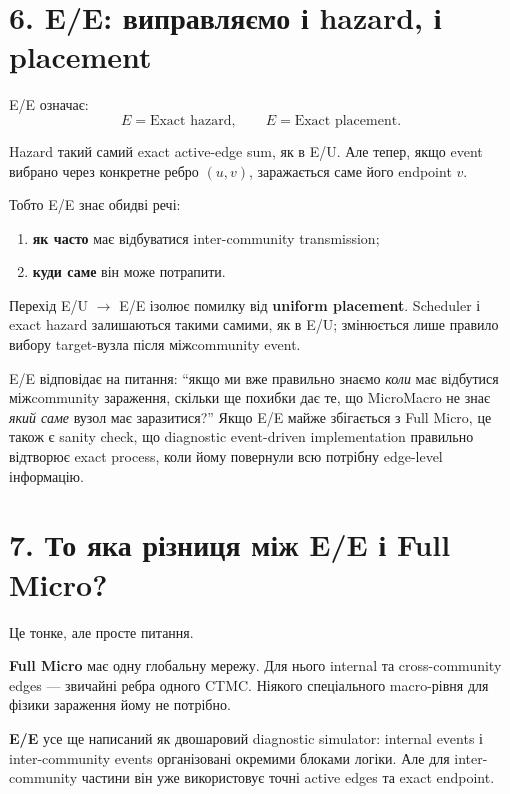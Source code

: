 \documentclass[11pt,a4paper]{article}
\begin{document}
\section*{6. E/E: виправляємо і hazard, і placement}

E/E означає:
\[
 \boxed{E=\text{Exact hazard}},\qquad
 \boxed{E=\text{Exact placement}}.
\]

Hazard такий самий exact active-edge sum, як в E/U. Але тепер, якщо event вибрано через конкретне ребро $(u,v)$, заражається саме його endpoint $v$.

Тобто E/E знає обидві речі:
\begin{enumerate}[nosep]
\item \textbf{як часто} має відбуватися inter-community transmission;
\item \textbf{куди саме} він може потрапити.
\end{enumerate}

Перехід E/U $\to$ E/E ізолює помилку від \textbf{uniform placement}. Scheduler і exact hazard залишаються такими самими, як в E/U; змінюється лише правило вибору target-вузла після міжcommunity event.

\begin{tcolorbox}[colback=white,colframe=exact,title=Що саме перевіряє E/E?]
E/E відповідає на питання: ``якщо ми вже правильно знаємо \textit{коли} має відбутися міжcommunity зараження, скільки ще похибки дає те, що MicroMacro не знає \textit{який саме} вузол має заразитися?'' Якщо E/E майже збігається з Full Micro, це також є sanity check, що diagnostic event-driven implementation правильно відтворює exact process, коли йому повернули всю потрібну edge-level інформацію.
\end{tcolorbox}

\section*{7. То яка різниця між E/E і Full Micro?}

Це тонке, але просте питання.

\textbf{Full Micro} має одну глобальну мережу. Для нього internal та cross-community edges --- звичайні ребра одного CTMC. Ніякого спеціального macro-рівня для фізики зараження йому не потрібно.

\textbf{E/E} усе ще написаний як двошаровий diagnostic simulator: internal events і inter-community events організовані окремими блоками логіки. Але для inter-community частини він уже використовує точні active edges та exact endpoint.
\end{document}

